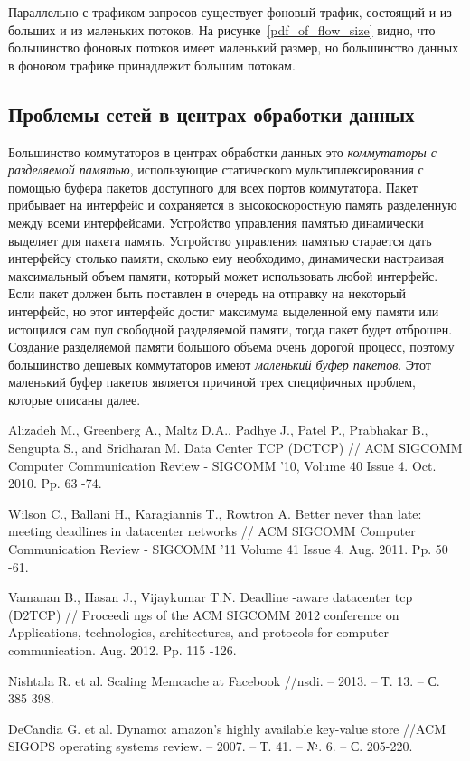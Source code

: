 \documentclass[14pt, a4paper,oneside]{extarticle}
\begin{document}
Параллельно с трафиком запросов существует фоновый трафик, состоящий и из больших и из маленьких потоков. %
На рисунке~\ref{pdf_of_flow_size} видно, что большинство фоновых потоков имеет маленький размер, но большинство данных в фоновом трафике принадлежит большим потокам.

\subsection{Проблемы сетей в центрах обработки данных}

Большинство коммутаторов в центрах обработки данных это \emph{коммутаторы с разделяемой памятью}, использующие статического мультиплексирования с помощью буфера пакетов доступного для всех портов коммутатора. Пакет прибывает на интерфейс и сохраняется в высокоскоростную память разделенную между всеми интерфейсами. Устройство управления памятью динамически выделяет для пакета память. Устройство управления памятью старается дать интерфейсу столько памяти, сколько ему необходимо, динамически настраивая максимальный объем памяти, который может использовать любой интерфейс.
Если пакет должен быть поставлен в очередь на отправку на некоторый интерфейс, но этот интерфейс достиг максимума выделенной ему памяти или истощился сам пул свободной разделяемой памяти, тогда пакет будет отброшен. Создание разделяемой памяти большого объема очень дорогой процесс, поэтому большинство дешевых коммутаторов имеют \emph{маленький буфер пакетов}. Этот маленький буфер пакетов является причиной трех специфичных проблем, которые описаны далее.


\newpage
\begin{thebibliography}{9}

Alizadeh M., Greenberg A., Maltz
 D.A., Padhye J., Patel P., Prabhakar B., 
Sengupta S., and Sridharan M. Data Center TCP (DCTCP) // ACM SIGCOMM 
Computer Communication Review -
 SIGCOMM '10, Volume 40 Issue 4. Oct. 
2010. Pp. 63
-74.

Wilson C., Ballani H., Karagiannis T., Rowtron
 A. Better never than late: meeting 
deadlines in datacenter networks // ACM SIGCOMM Computer Communication 
Review 
- SIGCOMM '11 Volume 41 Issue 4. Aug. 2011. Pp. 50
-61. 

Vamanan B., Hasan J., Vijaykumar T.N. Deadline
-aware datacenter tcp (D2TCP) 
// Proceedi
ngs of the ACM SIGCOMM 2012 conference on Applications, 
technologies, architectures, and protocols for computer communication. Aug. 
2012. Pp. 115
-126. 

Nishtala R. et al. Scaling Memcache at Facebook //nsdi. – 2013. – Т. 13. – С. 385-398.

DeCandia G. et al. Dynamo: amazon's highly available key-value store //ACM SIGOPS operating systems review. – 2007. – Т. 41. – №. 6. – С. 205-220.

\end{thebibliography}
\end{document}
